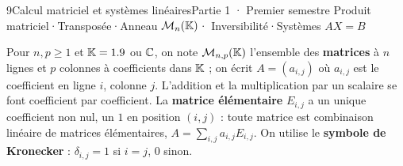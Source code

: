 
\begin{ouverture}[matrices]{9}{Calcul matriciel et systèmes linéaires}{Partie 1 · Premier semestre}
  {Produit matriciel\enspace·\enspace Transposée\enspace·\enspace Anneau $\mathcal{M}_n(\mathbb{K})$\enspace·\enspace
   Inversibilité\enspace·\enspace Systèmes $AX=B$}
\end{ouverture}

\essentiel


\begin{definition}[Matrices]
Pour $n,p\geq1$ et $\mathbb{K}=1.9$ ou $\mathbb{C}$, on note $\mathcal{M}_{n,p}(\mathbb{K})$
l'ensemble des \textbf{matrices} à $n$ lignes et $p$ colonnes à
coefficients dans $\mathbb{K}$ ; on écrit $A=(a_{i,j})$ où $a_{i,j}$ est le
coefficient en ligne $i$, colonne $j$. L'addition et la multiplication par
un scalaire se font coefficient par coefficient. La \textbf{matrice
élémentaire} $E_{i,j}$ a un unique coefficient non nul, un $1$ en position
$(i,j)$ : toute matrice est combinaison linéaire de matrices élémentaires,
$A=\sum_{i,j}a_{i,j}E_{i,j}$. On utilise le \textbf{symbole de Kronecker} :
$\delta_{i,j}=1$ si $i=j$, $0$ sinon.
\end{definition}


